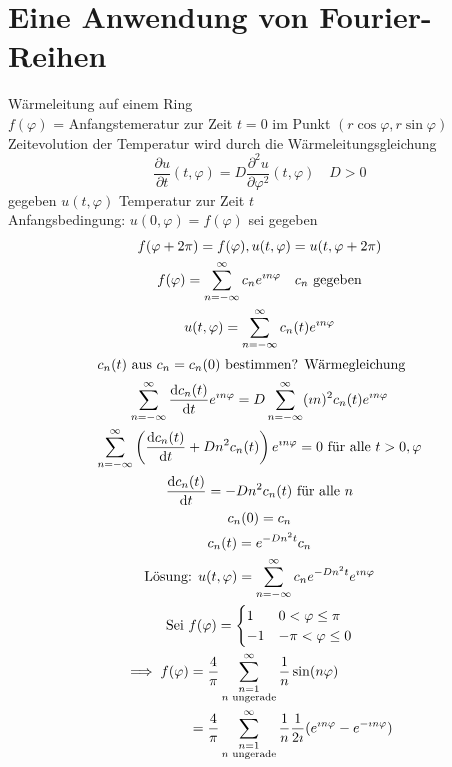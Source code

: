 \section{Eine Anwendung von Fourier-Reihen}
\begin{bsp*}
	Wärmeleitung auf einem Ring \\
	$f( \varphi )$ = Anfangstemeratur zur Zeit $t=0$ im Punkt $(r \cos \varphi , r \sin \varphi)$ \\
	Zeitevolution der Temperatur wird durch die Wärmeleitungsgleichung
	\[ \frac{\partial u}{\partial t}(t, \varphi) = D \frac{\partial^2 u}{\partial \varphi^2}( t , \varphi ) \quad D > 0 \]
	gegeben $u(t,\varphi)$ Temperatur zur Zeit $t$ \\
	Anfangsbedingung: $u(0,\varphi) = f(\varphi)$ sei gegeben
	\begin{gather*}
		f( \varphi + 2\pi ) = f( \varphi ) , u( t , \varphi ) = u( t ,\varphi + 2\pi ) \\
		f( \varphi ) = \sum_{n = -\infty}^\infty c_n e^{\imath n \varphi} \quad c_n \text{ gegeben} \\
		u( t , \varphi ) = \sum_{n = -\infty}^\infty c_n(t) e^{\imath n \varphi} \\
		\intertext{$c_n(t)$ aus $c_n = c_n(0)$ bestimmen? Wärmegleichung}
		\sum_{n = -\infty}^\infty \frac{\dd c_n(t)}{\dd t} e^{\imath n \varphi} = D \sum_{n = -\infty}^\infty (\imath n)^2 c_n(t) e^{\imath n \varphi} \\
		\sum_{n = -\infty}^\infty \left( \frac{\dd c_n(t)}{\dd t} + D n^2 c_n(t) \right) e^{\imath n \varphi} = 0 \text{ für alle } t > 0 , \varphi \\
		\frac{\dd c_n(t)}{\dd t} = -D n^2 c_n(t) \text{ für alle } n \\
		c_n(0) = c_n \\
		c_n(t) = e^{-D n^2 t} c_n \\
		\text{Lösung: } u( t , \varphi ) = \sum_{n = -\infty}^\infty c_n e^{-D n^2 t} e^{\imath n \varphi} \\
		\text{Sei } f(\varphi) = \begin{cases}
			1	& 0 < \varphi \leq \pi		\\
			-1	& -\pi < \varphi \leq 0	
		\end{cases} \\
		\begin{split}
			\implies f(\varphi)	&= \frac{4}{\pi} \sum_{\substack{n=1 \\ n \text{ ungerade}}}^\infty \frac{1}{n} \sin(n\varphi) \\
							&= \frac{4}{\pi} \sum_{\substack{n=1 \\ n \text{ ungerade}}}^\infty \frac{1}{n} \frac{1}{2\imath} ( e^{\imath n \varphi} - e^{-\imath n \varphi} ) \\

\end{split}
\end{gather*}
\end{bsp*}
